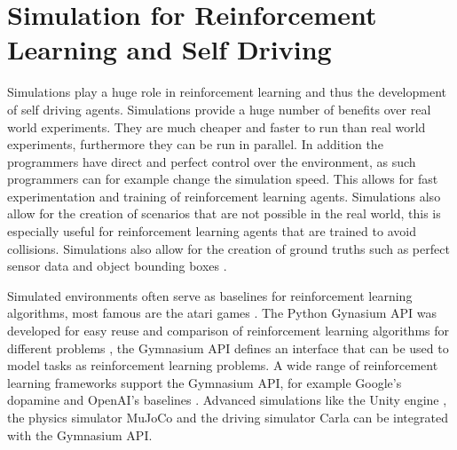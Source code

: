 






\section{Simulation for Reinforcement Learning and Self Driving}


Simulations play a huge role in reinforcement learning and thus the development of self driving agents. Simulations provide a huge number of benefits over real world experiments. They are much cheaper and faster to run than real world experiments, furthermore they can be run in parallel. In addition the programmers have direct and perfect control over the environment, as such programmers can for example change the simulation speed. This allows for fast experimentation and training of reinforcement learning agents. Simulations also allow for the creation of scenarios that are not possible in the real world, this is especially useful for reinforcement learning agents that are trained to avoid collisions. Simulations also allow for the creation of ground truths such as perfect sensor data and object bounding boxes \autocite{carla}.

Simulated environments often serve as baselines for reinforcement learning algorithms, most famous are the atari games \autocite{atari}. The Python Gynasium API was developed for easy reuse and comparison of reinforcement learning algorithms for different problems \autocite{gymnasium}, the Gymnasium API defines an interface that can be used to model tasks as reinforcement learning problems. A wide range of reinforcement learning frameworks support the Gymnasium API, for example Google's dopamine \autocite{dopamine} and OpenAI's baselines \autocite{sb3}. Advanced simulations like the Unity engine \autocite{unity}, the physics simulator MuJoCo \autocite{mujoco} and the driving simulator Carla \autocite{carla} can be integrated with the Gymnasium API.


